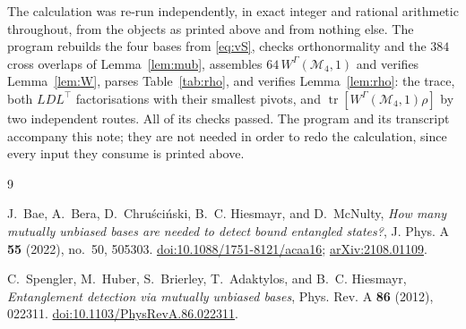 \documentclass[11pt]{amsart}
\DeclareMathOperator{\Tr}{tr}
\newcommand{\W}{W^{\Gamma}}
\newcommand{\M}{\mathcal M}
\begin{document}
The calculation was re-run independently, in exact integer and rational arithmetic
throughout, from the objects as printed above and from nothing else. The program
rebuilds the four bases from \eqref{eq:vS}, checks orthonormality and the $384$ cross
overlaps of Lemma~\ref{lem:mub}, assembles $64\,\W(\M_4,1)$ and verifies
Lemma~\ref{lem:W}, parses Table~\ref{tab:rho}, and verifies Lemma~\ref{lem:rho}: the
trace, both $LDL^{\!\top}$ factorisations with their smallest pivots, and
$\Tr[\W(\M_4,1)\rho]$ by two independent routes. All of its checks passed. The program
and its transcript accompany this note; they are not needed in order to redo the
calculation, since every input they consume is printed above.

\begin{thebibliography}{9}

J.~Bae, A.~Bera, D.~Chru\'sci\'nski, B.~C. Hiesmayr, and D.~McNulty,
\emph{How many mutually unbiased bases are needed to detect bound entangled states?},
J. Phys. A \textbf{55} (2022), no.~50, 505303.
\href{https://doi.org/10.1088/1751-8121/acaa16}{doi:10.1088/1751-8121/acaa16};
\href{https://arxiv.org/abs/2108.01109}{arXiv:2108.01109}.

C.~Spengler, M.~Huber, S.~Brierley, T.~Adaktylos, and B.~C. Hiesmayr,
\emph{Entanglement detection via mutually unbiased bases},
Phys. Rev. A \textbf{86} (2012), 022311.
\href{https://doi.org/10.1103/PhysRevA.86.022311}{doi:10.1103/PhysRevA.86.022311}.

\end{thebibliography}
\end{document}
